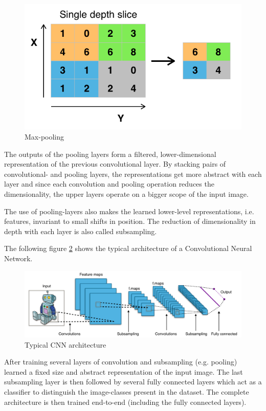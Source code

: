 \documentclass[	DIV=calc,%
				paper=a4,%
				fontsize=11pt,%
				twocolumn]{scrartcl}	 %
\begin{document}
\begin{figure}[H]
    \centering
    \includegraphics[width=.9\linewidth]{data/max_pooling.png}
    \caption{Max-pooling}
    \label{max_pooling}
\end{figure}

The outputs of the pooling layers form a filtered, lower-dimensional representation of the previous convolutional layer. By stacking pairs of convolutional- and pooling layers, the representations get more abstract with each layer and since each convolution and pooling operation reduces the dimensionality, the upper layers operate on a bigger scope of the input image.

The use of pooling-layers also makes the learned lower-level representations, i.e. features, invariant to small shifts in position. The reduction of dimensionality in depth with each layer is also called subsampling.

The following figure \ref{typical_architecture} shows the typical architecture of a Convolutional Neural Network.

\begin{figure}[H]
    \centering
    \includegraphics[width=\linewidth]{data/typical_cnn.png}
    \caption{Typical CNN architecture}
    \label{typical_architecture}
\end{figure}

After training several layers of convolution and subsampling (e.g. pooling) learned a fixed size and abstract representation of the input image. The last subsampling layer is then followed by several fully connected layers which act as a classifier to distinguish the image-classes present in the dataset. The complete architecture is then trained end-to-end (including the fully connected layers).
\end{document}
